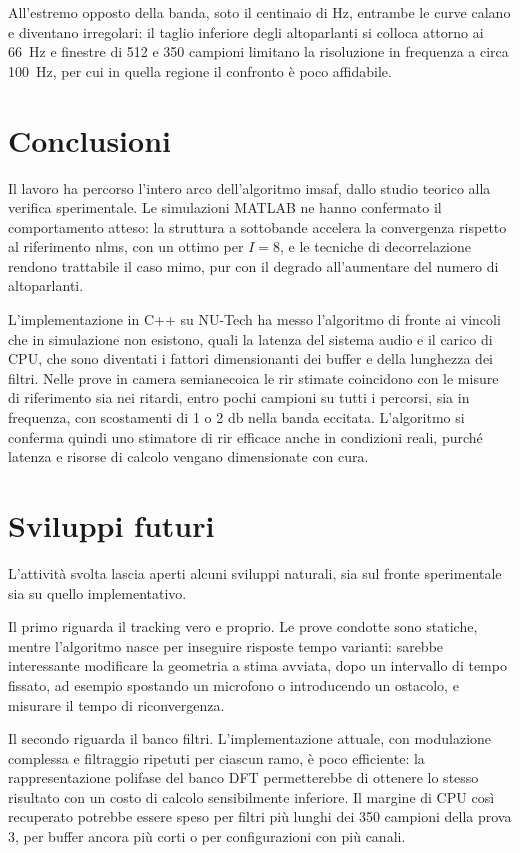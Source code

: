 \documentclass[11pt,a4paper]{article}
\begin{document}
	All'estremo opposto della banda, soto il centinaio di \si{\hertz}, entrambe le curve calano e diventano irregolari: il taglio inferiore degli altoparlanti si colloca attorno ai \SI{66}{\hertz} \cite{genelec8020a} e finestre di 512 e 350 campioni limitano la risoluzione in frequenza a circa \SI{100}{\hertz}, per cui in quella regione il confronto è poco affidabile.

	\newpage
	\section{Conclusioni}
	Il lavoro ha percorso l'intero arco dell'algoritmo \ac{imsaf}, dallo studio teorico alla verifica sperimentale.
	Le simulazioni MATLAB ne hanno confermato il comportamento atteso: la struttura a sottobande accelera la convergenza rispetto al riferimento \ac{nlms}, con un ottimo per $I = 8$, e le tecniche di decorrelazione rendono trattabile il caso \ac{mimo}, pur con il degrado all'aumentare del numero di altoparlanti.

	L'implementazione in C++ su NU-Tech ha messo l'algoritmo di fronte ai vincoli che in simulazione non esistono, quali la latenza del sistema audio e il carico di CPU, che sono diventati i fattori dimensionanti dei buffer e della lunghezza dei filtri.
	Nelle prove in camera semianecoica le \ac{rir} stimate coincidono con le misure di riferimento sia nei ritardi, entro pochi campioni su tutti i percorsi, sia in frequenza, con scostamenti di 1 o 2 \si{\decibel} nella banda eccitata.
	L'algoritmo si conferma quindi uno stimatore di \ac{rir} efficace anche in condizioni reali, purché latenza e risorse di calcolo vengano dimensionate con cura.

	\section{Sviluppi futuri}
	L'attività svolta lascia aperti alcuni sviluppi naturali, sia sul fronte sperimentale sia su quello implementativo.

	Il primo riguarda il tracking vero e proprio.
	Le prove condotte sono statiche, mentre l'algoritmo nasce per inseguire risposte tempo varianti: sarebbe interessante modificare la geometria a stima avviata, dopo un intervallo di tempo fissato, ad esempio spostando un microfono o introducendo un ostacolo, e misurare il tempo di riconvergenza.

	Il secondo riguarda il banco filtri.
	L'implementazione attuale, con modulazione complessa e filtraggio ripetuti per ciascun ramo, è poco efficiente: la rappresentazione polifase del banco DFT permetterebbe di ottenere lo stesso risultato con un costo di calcolo sensibilmente inferiore.
	Il margine di CPU così recuperato potrebbe essere speso per filtri più lunghi dei 350 campioni della prova 3, per buffer ancora più corti o per configurazioni con più canali.

	\newpage
	
	
\end{document}
